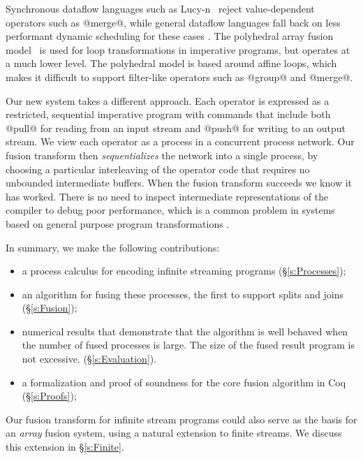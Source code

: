 
Synchronous dataflow languages such as Lucy-n~\cite{mandel2010lucy} reject value-dependent operators such as @merge@, while general dataflow languages fall back on less performant dynamic scheduling for these cases \cite{bouakaz2013real}. The polyhedral array fusion model~\cite{feautrier2011polyhedron} is used for loop transformations in imperative programs, but operates at a much lower level. The polyhedral model is based around affine loops, which makes it difficult to support filter-like operators such as @group@ and @merge@.

Our new system takes a different approach. Each operator is expressed as a restricted, sequential imperative program with commands that include both @pull@ for reading from an input stream and @push@ for writing to an output stream. We view each operator as a process in a concurrent process network. Our fusion transform then \emph{sequentializes} the network into a single process, by choosing a particular interleaving of the operator code that requires no unbounded intermediate buffers. When the fusion transform succeeds we know it has worked. There is no need to inspect intermediate representations of the compiler to debug poor performance, which is a common problem in systems based on general purpose program transformations \cite{lippmeier2012:guiding}.

In summary, we make the following contributions:
\begin{itemize}
\item a process calculus for encoding infinite streaming programs (\S\ref{s:Processes});
\item an algorithm for fusing these processes, the first to support splits and joins (\S\ref{s:Fusion});
\item numerical results that demonstrate that the algorithm is well behaved when the number of fused processes is large. The size of the fused result program is not excessive. (\S\ref{s:Evaluation}).
\item a formalization and proof of soundness for the core fusion algorithm in Coq (\S\ref{s:Proofs});
\end{itemize}

Our fusion transform for infinite stream programs could also serve as the basis for an \emph{array} fusion system, using a natural extension to finite streams. We discuss this extension in \S\ref{s:Finite}.

